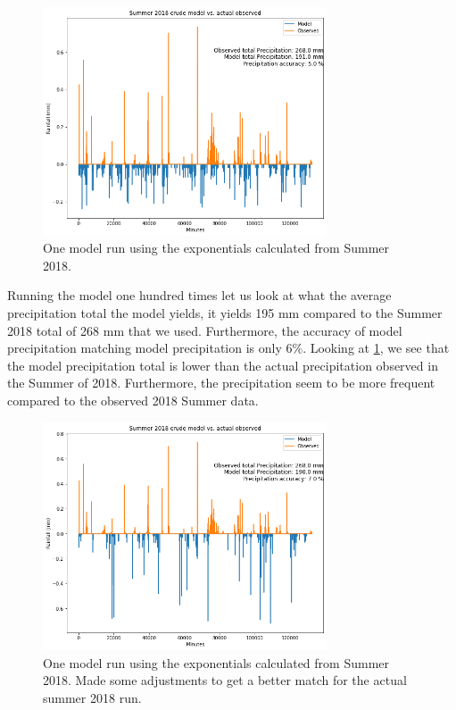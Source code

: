 \documentclass[11pt]{report}
\begin{document}
\begin{figure}[t]
  \centering
  \includegraphics[width=0.75\textwidth]{Figures/better_one_run.png}
  \caption[One run using Summer 2018 climatology]

  {\label{crudemodel}One model run using the exponentials calculated from Summer 2018.}
\end{figure}

Running the model one hundred times let us look at what the average
precipitation total the model yields, it yields 195 mm compared to the
Summer 2018 total of 268 mm that we used. Furthermore, the accuracy of model
precipitation matching model precipitation is only 6$\%$. Looking at
\ref{crudemodel}, we see that the model precipitation total is lower than
the actual precipitation observed in the Summer of 2018. Furthermore, the
precipitation seem to be more frequent compared to the observed 2018 Summer
data.

\clearpage
\begin{figure}[t]
  \centering
  \includegraphics[width=0.75\textwidth]{Figures/best_one_run.png}
  \caption[Modified run using Summer 2018 climatology]
  {\label{crudermodel} One model run using the exponentials calculated from
    Summer 2018. Made some adjustments to get a better match for the actual
    summer 2018 run.}
\end{figure}
\end{document}
